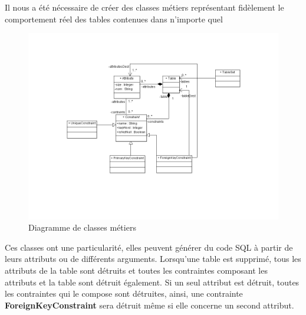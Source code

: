 Il nous a été nécessaire de créer des classes métiers représentant fidèlement le comportement réel des tables contenues dans n'importe quel \sgbd

\begin{figure}[!h]
\centering
\includegraphics[width=18cm]{images/metier.png}
\caption{Diagramme de classes métiers}
\label{classes_metiers}
\end{figure}


Ces classes ont une particularité, elles peuvent générer du code SQL à partir de leurs attributs ou de différents arguments.
Lorsqu'une table est supprimé, tous les attributs de la table sont détruits et toutes les contraintes composant les attributs et la table sont détruit également.
Si un seul attribut est détruit, toutes les contraintes qui le compose sont détruites, ainsi, une contrainte \textbf{ForeignKeyConstraint} sera détruit même si elle concerne un second attribut.
